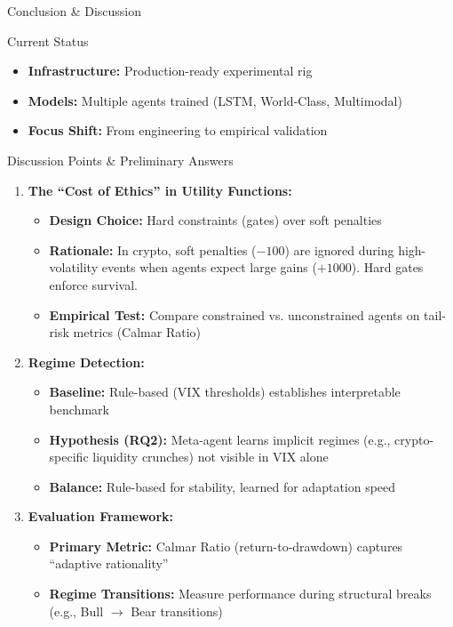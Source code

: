 \documentclass[aspectratio=169]{beamer}
\begin{document}
\begin{frame}{Conclusion \& Discussion}
\begin{block}{Current Status}
\begin{itemize}
    \item \textbf{Infrastructure:} Production-ready experimental rig
    \item \textbf{Models:} Multiple agents trained (LSTM, World-Class, Multimodal)
    \item \textbf{Focus Shift:} From engineering to \alert{empirical validation}
\end{itemize}
\end{block}

\vspace{0.3cm}

\begin{block}{Discussion Points \& Preliminary Answers}
\begin{enumerate}
    \item \textbf{The ``Cost of Ethics'' in Utility Functions:}
    \begin{itemize}
        \item \textbf{Design Choice:} Hard constraints (gates) over soft penalties
        \item \textbf{Rationale:} In crypto, soft penalties ($-100$) are ignored during high-volatility events when agents expect large gains ($+1000$). Hard gates enforce survival.
        \item \textbf{Empirical Test:} Compare constrained vs. unconstrained agents on tail-risk metrics (Calmar Ratio)
    \end{itemize}
    
    \item \textbf{Regime Detection:}
    \begin{itemize}
        \item \textbf{Baseline:} Rule-based (VIX thresholds) establishes interpretable benchmark
        \item \textbf{Hypothesis (RQ2):} Meta-agent learns implicit regimes (e.g., crypto-specific liquidity crunches) not visible in VIX alone
        \item \textbf{Balance:} Rule-based for stability, learned for adaptation speed
    \end{itemize}
    
    \item \textbf{Evaluation Framework:}
    \begin{itemize}
        \item \textbf{Primary Metric:} Calmar Ratio (return-to-drawdown) captures ``adaptive rationality''
        \item \textbf{Regime Transitions:} Measure performance during structural breaks (e.g., Bull $\rightarrow$ Bear transitions)
    \end{itemize}
\end{enumerate}
\end{block}
\end{frame}
\end{document}
